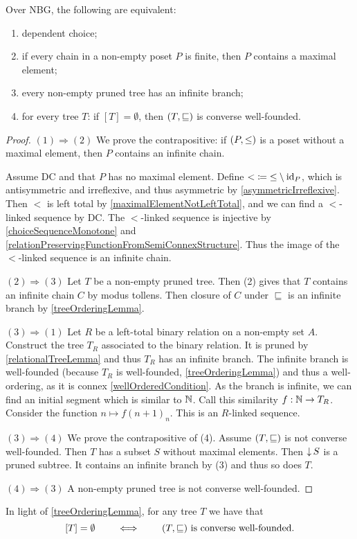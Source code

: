 \begin{proposition} \label{ZornEquivalentsDC}
Over NBG, the following are equivalent:
\begin{enumerate}
\item dependent choice;
\item if every chain in a non-empty poset $P$ is finite, then $P$ contains a maximal element;
\item every non-empty pruned tree has an infinite branch;
\item for every tree $T$: if $[T] = \emptyset$, then $\sSet{T,\sqsubseteq}$ is converse well-founded.
\end{enumerate}
\end{proposition}
\begin{proof}
$(1) \Rightarrow (2)$ We prove the contrapositive: if $\sSet{P, \leq}$ is a poset without a maximal element, then $P$ contains an infinite chain.

Assume DC and that $P$ has no maximal element. Define ${<} \coloneqq {\leq} \setminus\operatorname{id}_P$, which is antisymmetric and irreflexive, and thus asymmetric by \ref{asymmetricIrreflexive}. Then $<$ is left total by \ref{maximalElementNotLeftTotal}, and we can find a $<$-linked sequence by DC. The $<$-linked sequence is injective by \ref{choiceSequenceMonotone} and \ref{relationPreservingFunctionFromSemiConnexStructure}. Thus the image of the $<$-linked sequence is an infinite chain.

$(2) \Rightarrow (3)$ Let $T$ be a non-empty pruned tree. Then (2) gives that $T$ contains an infinite chain $C$ by modus tollens. Then closure of $C$ under $\sqsubseteq$ is an infinite branch by \ref{treeOrderingLemma}.

$(3) \Rightarrow (1)$ Let $R$ be a left-total binary relation on a non-empty set $A$. Construct the tree $T_R$ associated to the binary relation. It is pruned by \ref{relationalTreeLemma} and thus $T_R$ has an infinite branch. The infinite branch is well-founded (because $T_R$ is well-founded, \ref{treeOrderingLemma}) and thus a well-ordering, as it is connex \ref{wellOrderedCondition}. As the branch is infinite, we can find an initial segment which is similar to $\mathbb{N}$. Call this similarity $f: \mathbb{N} \to T_R$. Consider the function $n\mapsto f(n+1)_{n}$. This is an $R$-linked sequence.

$(3) \Rightarrow (4)$ We prove the contrapositive of (4). Assume $\sSet{T,\sqsubseteq}$ is not converse well-founded. Then $T$ has a subset $S$ without maximal elements. Then $\operatorname{\downarrow} S$ is a pruned subtree. It contains an infinite branch by (3) and thus so does $T$.

$(4) \Rightarrow (3)$ A non-empty pruned tree is not converse well-founded.
\end{proof}
In light of \ref{treeOrderingLemma}, for any tree $T$ we have that
\[ [T] = \emptyset \qquad\iff\qquad \text{$\sSet{T,\sqsubseteq}$ is converse well-founded.} \]

